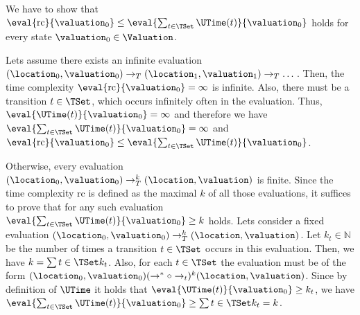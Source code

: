 We have to show that $\eval{\text{rc}}{\valuation_0} \leq \eval{\sum_{t \in \TSet}\UTime(t)}{\valuation_0}$ holds for every state $\valuation_0 \in \Valuation$.

Lets assume there exists an infinite evaluation $(\location_0, \valuation_0) \rightarrow_T (\location_1, \valuation_1) \rightarrow_T \dots$.
Then, the time complexity $\eval{\text{rc}}{\valuation_0} = \infty$ is infinite.
Also, there must be a transition $t \in \TSet$, which occurs infinitely often in the evaluation.
Thus, $\eval{\UTime(t)}{\valuation_0} = \infty$ and therefore we have $\eval{\sum_{t \in \TSet}\UTime(t)}{\valuation_0} = \infty$ and $\eval{\text{rc}}{\valuation_0} \leq \eval{\sum_{t \in \TSet}\UTime(t)}{\valuation_0}$.

Otherwise, every evaluation $(\location_0, \valuation_0) \rightarrow^k_T (\location, \valuation)$ is finite.
Since the time complexity $\text{rc}$ is defined as the maximal $k$ of all those evaluations, it suffices to prove that for any such evaluation $\eval{\sum_{t \in \TSet}\UTime(t)}{\valuation_0} \geq k$ holds.
Lets consider a fixed evaluation $(\location_0, \valuation_0) \rightarrow^k_T (\location, \valuation)$.
Let $k_t \in \mathbb{N}$ be the number of times a transition $t \in \TSet$ occurs in this evaluation.
Then, we have $k = \sum{t \in \TSet} k_t$.
Also, for each $t \in \TSet$ the evaluation must be of the form $(\location_0, \valuation_0) (\rightarrow^* \circ \rightarrow_t)^k (\location, \valuation)$.
Since by definition of $\UTime$ it holds that $\eval{\UTime(t)}{\valuation_0} \geq k_t$, we have $\eval{\sum_{t \in \TSet}\UTime(t)}{\valuation_0} \geq \sum{t \in \TSet} k_t = k$.
